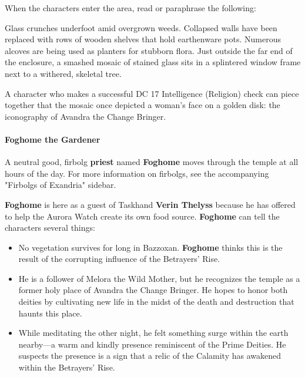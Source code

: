 \documentclass[letterpaper, 11pt, bg=full, twocolumn]{dndbook}
\begin{document}
When the characters enter the area, read or paraphrase the following:

\begin{DndReadAloud}
Glass crunches underfoot amid overgrown weeds. Collapsed walls have been replaced with rows of wooden shelves that hold earthenware pots. Numerous alcoves are being used as planters for stubborn flora. Just outside the far end of the enclosure, a smashed mosaic of stained glass sits in a splintered window frame next to a withered, skeletal tree.
\end{DndReadAloud}

A character who makes a successful DC 17 Intelligence (Religion) check can piece together that the mosaic once depicted a woman's face on a golden disk: the iconography of Avandra the Change Bringer.

\paragraph{Foghome the Gardener}

A neutral good, firbolg \textbf{priest} named \textbf{Foghome} moves through the temple at all hours of the day. For more information on firbolgs, see the accompanying "Firbolgs of Exandria" sidebar.


\textbf{Foghome} is here as a guest of Taskhand \textbf{Verin Thelyss} because he has offered to help the Aurora Watch create its own food source. \textbf{Foghome} can tell the characters several things:

\begin{itemize}
\item No vegetation survives for long in Bazzoxan. \textbf{Foghome} thinks this is the result of the corrupting influence of the Betrayers' Rise.
\item He is a follower of Melora the Wild Mother, but he recognizes the temple as a former holy place of Avandra the Change Bringer. He hopes to honor both deities by cultivating new life in the midst of the death and destruction that haunts this place.
\item While meditating the other night, he felt something surge within the earth nearby---a warm and kindly presence reminiscent of the Prime Deities. He suspects the presence is a sign that a relic of the Calamity has awakened within the Betrayers' Rise.
\end{itemize}
\end{document}
